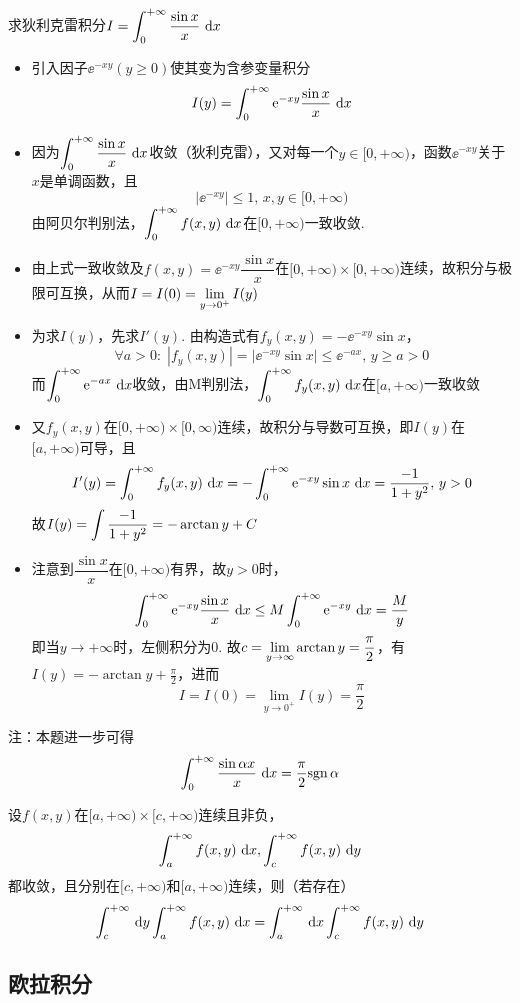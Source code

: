 \begin{example}
求狄利克雷积分$I=\displaystyle\int_{0}^{+\infty}{\frac{\sin x}{x}}\,\,\mathrm{d} x$
\end{example}
\begin{analysis}
\begin{itemize}
\item 引入因子$\ee^{-xy}(y\geq 0)$使其变为含参变量积分
\[I(y)=\displaystyle\int_{0}^{+\infty}{\mathrm{e}^{-xy}\frac{\sin x}{x}}\,\,\mathrm{d} x\]
\item 因为$\displaystyle\int_{0}^{+\infty}{\frac{\sin x}{x}}\,\,\mathrm{d} x$收敛（狄利克雷），又对每一个$y\in[0,+\infty)$，函数$\ee^{-xy}$关于$x$是单调函数，且
\[|\ee^{-xy}|\leq 1,\,x,y\in[0,+\infty)\]
由阿贝尔判别法，$\displaystyle\int_{0}^{+\infty}{f(x,y)}\,\,\mathrm{d} x$在$[0,+\infty)$一致收敛.
\item 由上式一致收敛及$f(x,y)=\ee^{-xy}\dfrac{\sin x}{x}$在$[0,+\infty)\times[0,+\infty)$连续，故积分与极限可互换，从而$I=I(0)=\displaystyle\lim_{y\to 0^+}I(y)$
\item 为求$I(y)$，先求$I'(y)$.
由构造式有$f_y(x,y)=-\ee^{-xy}\sin x$，
\[\forall a>0:\;|f_y(x,y)|=|\ee^{-xy}\sin x|\leq \ee^{-ax},\,y\geq a>0\]
而$\displaystyle\int_{0}^{+\infty}{\mathrm{e}^{-ax}}\,\,\mathrm{d} x$收敛，由M判别法，$\displaystyle\int_{0}^{+\infty}{f_y(x,y)}\,\,\mathrm{d} x$在$[a,+\infty)$一致收敛
\item 又$f_y(x,y)$在$[0,+\infty)\times[0,\infty)$连续，故积分与导数可互换，即$I(y)$在$[a,+\infty)$可导，且
\[I'(y)=\displaystyle\int_{0}^{+\infty}{f_y(x,y)}\,\,\mathrm{d} x=-\displaystyle\int_{0}^{+\infty}{\mathrm{e}^{-xy}\sin x}\,\,\mathrm{d} x=\frac{-1}{1+y^2},\,y>0\]
故$I(y)=\displaystyle\int\frac{-1}{1+y^2}=-\arctan y+C$
\item 注意到$\dfrac{\sin x}{x}$在$[0,+\infty)$有界，故$y>0$时，
\[\displaystyle\int_{0}^{+\infty}{\mathrm{e}^{-xy}\frac{\sin x}{x}}\,\,\mathrm{d} x\leq M\displaystyle\int_{0}^{+\infty}{\mathrm{e}^{-xy}}\,\,\mathrm{d} x=\frac{M}{y}\]
即当$y\to +\infty$时，左侧积分为$0$.
故$\displaystyle c=\lim_{y\to\infty}\arctan y=\frac{\pi}{2}$，有$I(y)=-\arctan y+\frac{\pi}{2}$，进而
\[I=I(0)=\lim_{y\to 0^+}I(y)=\frac{\pi}{2}\]
\end{itemize}
注：本题进一步可得
\[\displaystyle\int_{0}^{+\infty}{\frac{\sin\alpha x}{x}}\,\,\mathrm{d} x=\frac{\pi}{2}\mathrm{sgn}\,\alpha\]
\end{analysis}
\begin{theorem}
设$f(x,y)$在$[a,+\infty)\times[c,+\infty)$连续且非负，
\[\displaystyle\int_{a}^{+\infty}{f(x,y)}\,\,\mathrm{d} x,\displaystyle\int_{c}^{+\infty}{f(x,y)}\,\,\mathrm{d} y\]
都收敛，且分别在$[c,+\infty)$和$[a,+\infty)$连续，则（若存在）
\[\int_c^{+\infty}\,\mathrm{d} y\displaystyle\int_{a}^{+\infty}{f(x,y)}\,\,\mathrm{d} x=\int_a^{+\infty}\,\mathrm{d} x\displaystyle\int_{c}^{+\infty}{f(x,y)}\,\,\mathrm{d} y\]
\end{theorem}

\subsection{欧拉积分}

